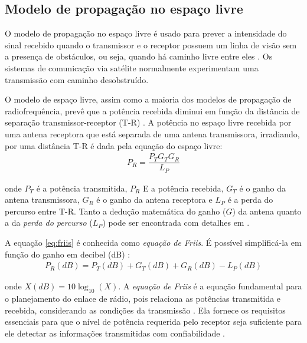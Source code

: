 \subsection{Modelo de propagação no espaço livre}
\label{sub:espaco-livre}

O modelo de propagação no espaço livre é usado para prever a intensidade do sinal recebido quando o transmissor e o receptor possuem um linha de visão sem a presença de obstáculos, ou seja, quando há caminho livre entre eles \cite{rappaport2009}. Os sistemas de comunicação via satélite normalmente experimentam uma transmissão com caminho desobstruído.

O modelo de espaço livre, assim como a maioria dos modelos de propagação de radiofrequência, prevê que a potência recebida diminui em função da distância de separação transmissor-receptor (T-R) \cite{rappaport2009}. A potência no espaço livre recebida por uma antena receptora que está separada de uma antena transmissora, irradiando, por uma distância T-R é dada pela equação do espaço livre:
\begin{equation}
	\begin{aligned}
	\label{eq:friis}
		P_R = \dfrac{P_TG_TG_R}{L_P}
	\end{aligned}
\end{equation}

\noindent onde $P_T$ é a potência transmitida, $P_R$ E a potência recebida, $G_T$ é o ganho da antena transmissora, $G_R$ é o ganho da antena receptora e $L_P$ é a perda do percurso entre T-R. Tanto a dedução matemática do ganho ($G$) da antena quanto a da \emph{perda do percurso} ($L_P$) pode ser encontrada com detalhes em .

A equação \ref{eq:friis} é conhecida como \emph{equação de Friis}. É possível simplificá-la em função do ganho em decibel (dB) \cite{haykin2008}:
\begin{equation}
	\begin{aligned}
	\label{eq:friis-decibel}
		P_R(dB) = P_T(dB) + G_T(dB) + G_R(dB) - L_P(dB)
	\end{aligned}
\end{equation}

\noindent onde $X(dB) = 10\log_{10} (X)$. A \emph{equação de Friis} é a equação fundamental para o planejamento do enlace de rádio, pois relaciona as potências transmitida e recebida, considerando as condições da transmissão \cite{haykin2008}. Ela fornece os requisitos essenciais para que o nível de potência requerida pelo receptor seja suficiente para ele detectar as informações transmitidas com confiabilidade \cite{haykin2008}.

